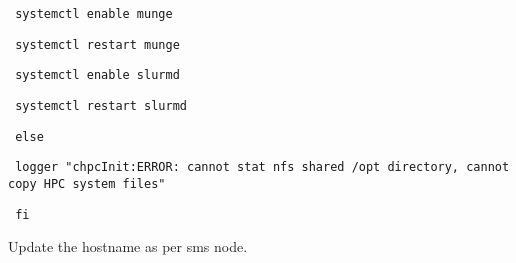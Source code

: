 \documentclass[12pt]{article}
\begin{document}
\begin{bash}\texttt{\small{     systemctl enable munge}}\end{bash}
\begin{bash}\texttt{\small{     systemctl restart munge}}\end{bash}
\begin{bash}\texttt{\small{     systemctl enable slurmd}}\end{bash}
\begin{bash}\texttt{\small{     systemctl restart slurmd}}\end{bash}
\begin{bash}\texttt{\small{ else}}\end{bash}
\begin{bash}\texttt{\small{     logger "chpcInit:ERROR: cannot stat nfs shared /opt directory, cannot copy HPC system files"}}\end{bash}
\begin{bash}\texttt{\small{ fi}}\end{bash}

Update the hostname as per sms node.
\end{document}

